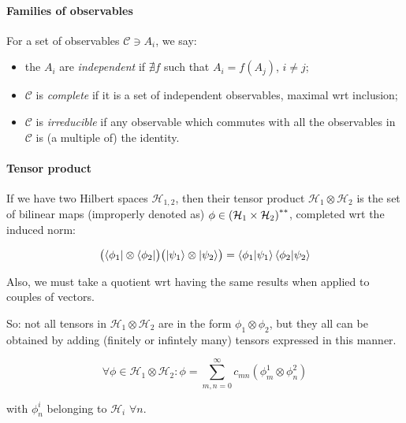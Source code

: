 \documentclass[main.tex]{subfiles}
\begin{document}
\paragraph{Families of observables}

For a set of observables $\mathcal{C} \ni A_i$, we say:

\begin{itemize}
    \item the $A_i$ are \emph{independent} if $\nexists f$ such that $A_i = f(A_j)$, $i \neq j$;
    \item $\mathcal{C}$ is \emph{complete} if it is a set of independent   observables, maximal wrt inclusion;
    \item $\mathcal{C}$ is \emph{irreducible} if any observable which commutes with all the observables in $\mathcal{C}$ is (a multiple of) the identity.
\end{itemize}

\paragraph{Tensor product} If we have two Hilbert spaces $\mathcal{H}_{1, 2}$, then their tensor product $\mathcal{H}_1 \otimes \mathcal{H}_2$ is the set of bilinear maps (improperly denoted as) $\phi \in \qty(\mathcal{H}_1 \times \mathcal{H}_2)^{**}$, completed wrt the induced norm:

\begin{equation}
    \qty( \bra{\phi_1} \otimes \bra{\phi_2} )
    \qty( \ket{\psi_1} \otimes \ket{\psi_2} ) =
    \braket{\phi_1}{\psi_1} \braket{\phi_2}{\psi_2}
\end{equation}

Also, we must take a quotient wrt having the same results when applied to couples of vectors.

So: not all tensors in  $\mathcal{H}_1 \otimes \mathcal{H}_2$ are in the form $\phi_1 \otimes \phi_2$, but they all can be obtained by adding (finitely or infintely many) tensors expressed in this manner.

\begin{equation}
    \forall \phi \in \mathcal{H}_1 \otimes \mathcal{H}_2: \phi = \sum_{m, n = 0}^\infty c_{mn} (\phi^1_m \otimes \phi^2_n )
\end{equation}

with $\phi^i_n$ belonging to $\mathcal{H}_i$ $\forall n$.

\end{document}
